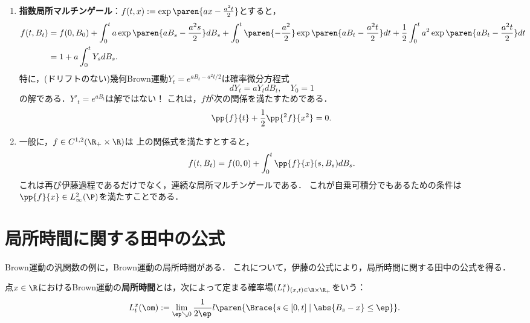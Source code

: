 \documentclass[uplatex,dvipdfmx]{jsreport}
\begin{document}
\begin{example}[局所マルチンゲールの構成公式]\mbox{}\label{exp-local-martingale-from-Ito-formula}
    \begin{enumerate}
        \item \textbf{指数局所マルチンゲール}：$f(t,x):=\exp\paren{ax-\frac{a^2t}{2}}$とすると，
        \begin{align*}
            f(t,B_t)&=f(0,B_0)+\int^t_0a\exp\paren{aB_s-\frac{a^2s}{2}}dB_s+\int^t_0\paren{-\frac{a^2}{2}}\exp\paren{aB_t-\frac{a^2t}{2}}dt+\frac{1}{2}\int^t_0a^2\exp\paren{aB_t-\frac{a^2t}{2}}dt\\
            &=1+a\int^t_0Y_sdB_s.
        \end{align*}
        特に，(ドリフトのない)幾何Brown運動$Y_t=e^{aB_t-a^2t/2}$は確率微分方程式
        \[dY_t=aY_tdB_t,\quad Y_0=1\]
        の解である．$Y'_t=e^{aB_t}$は解ではない！
        これは，$f$が次の関係を満たすためである．
        \[\pp{f}{t}+\frac{1}{2}\pp{^2f}{x^2}=0.\]
        \item 一般に，$f\in C^{1,2}(\R_+\times\R)$は
        上の関係式を満たすとすると，
        \[f(t,B_t)=f(0,0)+\int^t_0\pp{f}{x}(s,B_s)dB_s.\]
        これは再び伊藤過程であるだけでなく，連続な局所マルチンゲールである．
        これが自乗可積分でもあるための条件は$\pp{f}{x}\in L^2_\infty(\P)$を満たすことである．
    \end{enumerate}
\end{example}

\section{局所時間に関する田中の公式}

\begin{tcolorbox}[colframe=ForestGreen, colback=ForestGreen!10!white,breakable,colbacktitle=ForestGreen!40!white,coltitle=black,fonttitle=\bfseries\sffamily,
title=]
    Brown運動の汎関数の例に，Brown運動の局所時間がある．
    これについて，伊藤の公式により，局所時間に関する田中の公式を得る．
\end{tcolorbox}

\begin{definition}
    点$x\in\R$におけるBrown運動の\textbf{局所時間}とは，次によって定まる確率場$(L^x_t)_{(x,t)\in\R\times\R_+}$をいう：
    \[L^x_t(\om):=\lim_{\ep\searrow0}\frac{1}{2\ep}l\paren{\Brace{s\in[0,t]\mid\abs{B_s-x}\le\ep}}.\]
\end{definition}
\end{document}
